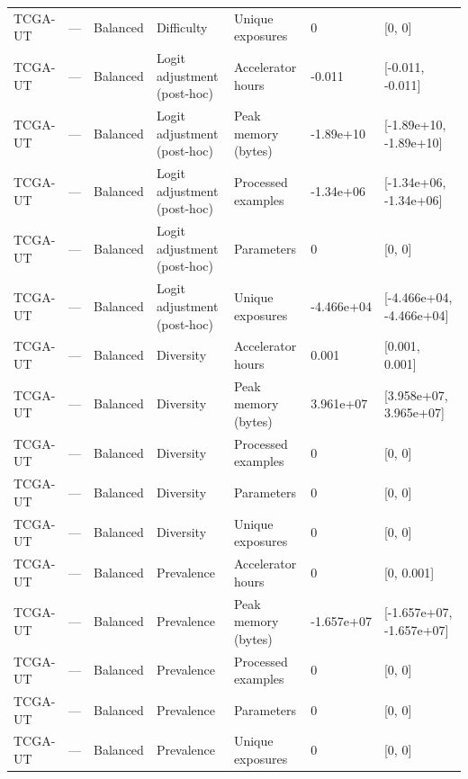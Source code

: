 \begin{longtable}{lllllll}
TCGA-UT & --- & Balanced & Difficulty & Unique exposures & 0 & [0, 0] \\
TCGA-UT & --- & Balanced & Logit adjustment (post-hoc) & Accelerator hours & -0.011 & [-0.011, -0.011] \\
TCGA-UT & --- & Balanced & Logit adjustment (post-hoc) & Peak memory (bytes) & -1.89e+10 & [-1.89e+10, -1.89e+10] \\
TCGA-UT & --- & Balanced & Logit adjustment (post-hoc) & Processed examples & -1.34e+06 & [-1.34e+06, -1.34e+06] \\
TCGA-UT & --- & Balanced & Logit adjustment (post-hoc) & Parameters & 0 & [0, 0] \\
TCGA-UT & --- & Balanced & Logit adjustment (post-hoc) & Unique exposures & -4.466e+04 & [-4.466e+04, -4.466e+04] \\
TCGA-UT & --- & Balanced & Diversity & Accelerator hours & 0.001 & [0.001, 0.001] \\
TCGA-UT & --- & Balanced & Diversity & Peak memory (bytes) & 3.961e+07 & [3.958e+07, 3.965e+07] \\
TCGA-UT & --- & Balanced & Diversity & Processed examples & 0 & [0, 0] \\
TCGA-UT & --- & Balanced & Diversity & Parameters & 0 & [0, 0] \\
TCGA-UT & --- & Balanced & Diversity & Unique exposures & 0 & [0, 0] \\
TCGA-UT & --- & Balanced & Prevalence & Accelerator hours & 0 & [0, 0.001] \\
TCGA-UT & --- & Balanced & Prevalence & Peak memory (bytes) & -1.657e+07 & [-1.657e+07, -1.657e+07] \\
TCGA-UT & --- & Balanced & Prevalence & Processed examples & 0 & [0, 0] \\
TCGA-UT & --- & Balanced & Prevalence & Parameters & 0 & [0, 0] \\
TCGA-UT & --- & Balanced & Prevalence & Unique exposures & 0 & [0, 0] \\
\end{longtable}
